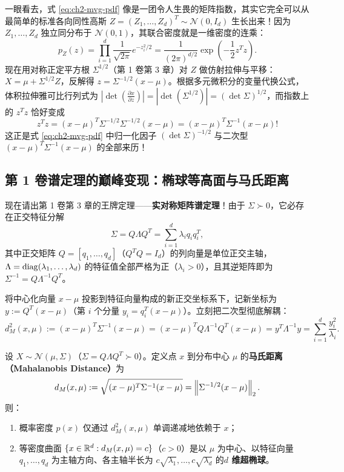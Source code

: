 一眼看去，式 \eqref{eq:ch2-mvg-pdf} 像是一团令人生畏的矩阵指数，其实它完全可以从最简单的标准各向同性高斯 $Z = (Z_1, \dots, Z_d)^T \sim \mathcal{N}(0, I_d)$ 生长出来！因为 $Z_1, \dots, Z_d$ 独立同分布于 $\mathcal{N}(0,1)$，其联合密度就是一维密度的连乘：
\[
  p_Z(z) = \prod_{i=1}^d \frac{1}{\sqrt{2\pi}} e^{-z_i^2 / 2} = \frac{1}{(2\pi)^{d/2}} \exp\!\left(-\frac{1}{2} z^T z\right).
\]
现在用对称正定平方根 $\Sigma^{1/2}$（第 1 卷第 3 章）对 $Z$ 做仿射拉伸与平移：$X = \mu + \Sigma^{1/2} Z$，反解得 $z = \Sigma^{-1/2}(x - \mu)$。根据多元微积分的变量代换公式，体积拉伸雅可比行列式为 $|\det(\frac{\partial x}{\partial z})| = |\det(\Sigma^{1/2})| = (\det\Sigma)^{1/2}$，而指数上的 $z^T z$ 恰好变成
\[
  z^T z = (x - \mu)^T \Sigma^{-1/2} \Sigma^{-1/2} (x - \mu) = (x - \mu)^T \Sigma^{-1} (x - \mu)!
\]
这正是式 \eqref{eq:ch2-mvg-pdf} 中归一化因子 $(\det\Sigma)^{-1/2}$ 与二次型 $(x-\mu)^T\Sigma^{-1}(x-\mu)$ 的全部来历！

\subsection{第 1 卷谱定理的巅峰变现：椭球等高面与马氏距离}

现在请出第 1 卷第 3 章的王牌定理——\textbf{实对称矩阵谱定理}！由于 $\Sigma \succ 0$，它必存在正交特征分解
\[
  \Sigma = Q \Lambda Q^T = \sum_{i=1}^d \lambda_i q_i q_i^T,
\]
其中正交矩阵 $Q = [q_1, \dots, q_d]$（$Q^T Q = I_d$）的列向量是单位正交主轴，$\Lambda = \operatorname{diag}(\lambda_1, \dots, \lambda_d)$ 的特征值全部严格为正（$\lambda_i > 0$），且其逆矩阵即为 $\Sigma^{-1} = Q \Lambda^{-1} Q^T$。

将中心化向量 $x - \mu$ 投影到特征向量构成的新正交坐标系下，记新坐标为 $y := Q^T(x - \mu)$（第 $i$ 个分量 $y_i = q_i^T(x - \mu)$）。立刻把二次型彻底解耦：
\begin{equation}
  d_M^2(x, \mu) := (x - \mu)^T \Sigma^{-1} (x - \mu)
  = (x - \mu)^T Q \Lambda^{-1} Q^T (x - \mu)
  = y^T \Lambda^{-1} y
  = \sum_{i=1}^d \frac{y_i^2}{\lambda_i}.
  \label{eq:ch2-mahalanobis-decouple}
\end{equation}

\begin{thmBox}
\begin{proposition}[多元高斯的椭球几何与马氏距离]
\label{prop:ch2-mvg-ellipsoid}
设 $X \sim \mathcal{N}(\mu, \Sigma)$（$\Sigma = Q\Lambda Q^T \succ 0$）。定义点 $x$ 到分布中心 $\mu$ 的\textbf{马氏距离（Mahalanobis Distance）}为
\[
  d_M(x, \mu) := \sqrt{(x - \mu)^T \Sigma^{-1} (x - \mu)} = \left\|\Sigma^{-1/2}(x - \mu)\right\|_2.
\]
则：
\begin{enumerate}
  \item 概率密度 $p(x)$ 仅通过 $d_M^2(x, \mu)$ 单调递减地依赖于 $x$；
  \item 等密度曲面 $\{x \in \mathbb{R}^d : d_M(x, \mu) = c\}$（$c > 0$）是以 $\mu$ 为中心、以特征向量 $q_1, \dots, q_d$ 为主轴方向、各主轴半长为 $c\sqrt{\lambda_1}, \dots, c\sqrt{\lambda_d}$ 的\textbf{$d$ 维超椭球}。
\end{enumerate}
\end{proposition}
\end{thmBox}

